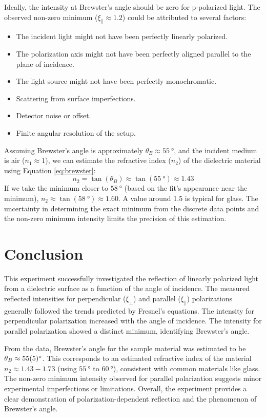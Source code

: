 \documentclass[journal]{IEEEtran}
\begin{document}
Ideally, the intensity at Brewster's angle should be zero for p-polarized light. The observed non-zero minimum ($\xi_{\parallel} \approx 1.2$) could be attributed to several factors:
\begin{itemize}
    \item The incident light might not have been perfectly linearly polarized.
    \item The polarization axis might not have been perfectly aligned parallel to the plane of incidence.
    \item The light source might not have been perfectly monochromatic.
    \item Scattering from surface imperfections.
    \item Detector noise or offset.
    \item Finite angular resolution of the setup.
\end{itemize}

Assuming Brewster's angle is approximately $\theta_B \approx \SI{55}{\degree}$, and the incident medium is air ($n_1 \approx 1$), we can estimate the refractive index ($n_2$) of the dielectric material using Equation \ref{eq:brewster}:
\begin{equation}
    n_2 = \tan(\theta_B) \approx \tan(\SI{55}{\degree}) \approx 1.43
\end{equation}
If we take the minimum closer to $\SI{58}{\degree}$ (based on the fit's appearance near the minimum), $n_2 \approx \tan(\SI{58}{\degree}) \approx 1.60$. A value around 1.5 is typical for glass. The uncertainty in determining the exact minimum from the discrete data points and the non-zero minimum intensity limits the precision of this estimation.

\section{Conclusion}
This experiment successfully investigated the reflection of linearly polarized light from a dielectric surface as a function of the angle of incidence. The measured reflected intensities for perpendicular ($\xi_{\perp}$) and parallel ($\xi_{\parallel}$) polarizations generally followed the trends predicted by Fresnel's equations. The intensity for perpendicular polarization increased with the angle of incidence. The intensity for parallel polarization showed a distinct minimum, identifying Brewster's angle.

From the data, Brewster's angle for the sample material was estimated to be $\theta_B \approx \SI{55 \pm 5}{\degree}$. This corresponds to an estimated refractive index of the material $n_2 \approx 1.43 - 1.73$ (using $\SI{55}{\degree}$ to $\SI{60}{\degree}$), consistent with common materials like glass. The non-zero minimum intensity observed for parallel polarization suggests minor experimental imperfections or limitations. Overall, the experiment provides a clear demonstration of polarization-dependent reflection and the phenomenon of Brewster's angle.
\end{document}
